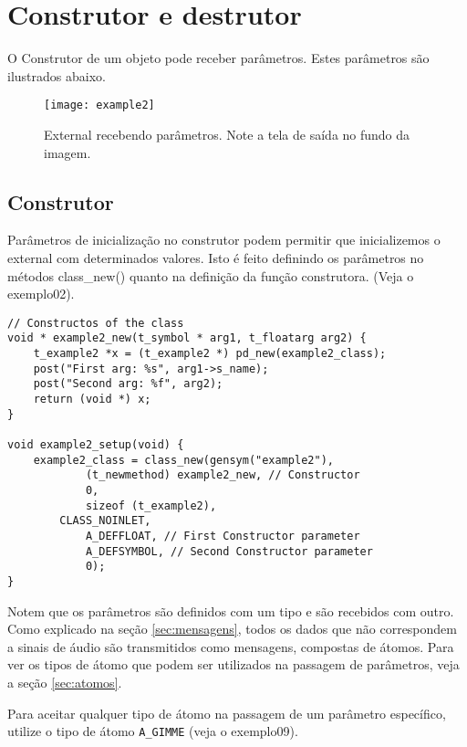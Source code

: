 
\chapter{Construtor e destrutor}

O Construtor de um objeto pode receber parâmetros. Estes parâmetros são
ilustrados abaixo.

\begin{figure}[h!]
	\centering
	\texttt{[image: example2]}
	\caption{External recebendo parâmetros. Note a tela de saída no fundo da imagem.}
\end{figure}

\section{Construtor}

Parâmetros de inicialização no construtor podem permitir que inicializemos o
external com determinados valores. Isto é feito definindo os parâmetros no
métodos class\_new() quanto na definição da função construtora. (Veja o
exemplo02).

\begin{lstlisting}
// Constructos of the class
void * example2_new(t_symbol * arg1, t_floatarg arg2) {
    t_example2 *x = (t_example2 *) pd_new(example2_class);
    post("First arg: %s", arg1->s_name);
    post("Second arg: %f", arg2);
    return (void *) x;
}

void example2_setup(void) {
    example2_class = class_new(gensym("example2"),
            (t_newmethod) example2_new, // Constructor
            0,
            sizeof (t_example2),
	    CLASS_NOINLET,
            A_DEFFLOAT, // First Constructor parameter
            A_DEFSYMBOL, // Second Constructor parameter
            0);
}
\end{lstlisting}

Notem que os parâmetros são definidos com um tipo e são recebidos com outro.
Como explicado na seção \ref{sec:mensagens}, todos os dados que não
correspondem a sinais de áudio são transmitidos como mensagens, compostas de
átomos. Para ver os tipos de átomo que podem ser utilizados na passagem de
parâmetros, veja a seção \ref{sec:atomos}.

Para aceitar qualquer tipo de átomo na passagem de um parâmetro específico,
utilize o tipo de átomo \texttt{A\_GIMME} (veja o exemplo09).

